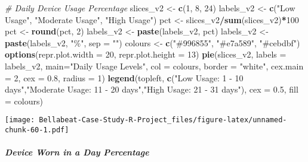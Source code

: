 \documentclass[
]{article}
\newenvironment{Shaded}{\begin{snugshade}}{\end{snugshade}}
\newcommand{\AttributeTok}[1]{\textcolor[rgb]{0.13,0.29,0.53}{#1}}
\newcommand{\CommentTok}[1]{\textcolor[rgb]{0.56,0.35,0.01}{\textit{#1}}}
\newcommand{\DecValTok}[1]{\textcolor[rgb]{0.00,0.00,0.81}{#1}}
\newcommand{\FloatTok}[1]{\textcolor[rgb]{0.00,0.00,0.81}{#1}}
\newcommand{\FunctionTok}[1]{\textcolor[rgb]{0.13,0.29,0.53}{\textbf{#1}}}
\newcommand{\NormalTok}[1]{#1}
\newcommand{\OtherTok}[1]{\textcolor[rgb]{0.56,0.35,0.01}{#1}}
\newcommand{\SpecialCharTok}[1]{\textcolor[rgb]{0.81,0.36,0.00}{\textbf{#1}}}
\newcommand{\StringTok}[1]{\textcolor[rgb]{0.31,0.60,0.02}{#1}}
\begin{document}
\begin{Shaded}
\begin{Highlighting}[]
\CommentTok{\# Daily Device Usage Percentage}
\NormalTok{slices\_v2 }\OtherTok{\textless{}{-}} \FunctionTok{c}\NormalTok{(}\DecValTok{1}\NormalTok{, }\DecValTok{8}\NormalTok{, }\DecValTok{24}\NormalTok{)}
\NormalTok{labels\_v2 }\OtherTok{\textless{}{-}} \FunctionTok{c}\NormalTok{(}\StringTok{"Low Usage"}\NormalTok{, }\StringTok{"Moderate Usage"}\NormalTok{, }\StringTok{"High Usage"}\NormalTok{)}
\NormalTok{pct }\OtherTok{\textless{}{-}}\NormalTok{ slices\_v2}\SpecialCharTok{/}\FunctionTok{sum}\NormalTok{(slices\_v2)}\SpecialCharTok{*}\DecValTok{100}
\NormalTok{pct }\OtherTok{\textless{}{-}} \FunctionTok{round}\NormalTok{(pct, }\DecValTok{2}\NormalTok{)}
\NormalTok{labels\_v2 }\OtherTok{\textless{}{-}} \FunctionTok{paste}\NormalTok{(labels\_v2, pct)}
\NormalTok{labels\_v2 }\OtherTok{\textless{}{-}} \FunctionTok{paste}\NormalTok{(labels\_v2, }\StringTok{"\%"}\NormalTok{, }\AttributeTok{sep =} \StringTok{""}\NormalTok{)}
\NormalTok{colours }\OtherTok{\textless{}{-}} \FunctionTok{c}\NormalTok{(}\StringTok{"\#996855"}\NormalTok{, }\StringTok{"\#e7a589"}\NormalTok{, }\StringTok{"\#cebdbf"}\NormalTok{)}
\FunctionTok{options}\NormalTok{(}\AttributeTok{repr.plot.width =} \DecValTok{20}\NormalTok{, }\AttributeTok{repr.plot.height =} \DecValTok{13}\NormalTok{)}
\FunctionTok{pie}\NormalTok{(slices\_v2, }\AttributeTok{labels =}\NormalTok{ labels\_v2,}
    \AttributeTok{main=}\StringTok{"Daily Usage Levels"}\NormalTok{,}
    \AttributeTok{col =}\NormalTok{ colours, }
    \AttributeTok{border =} \StringTok{"white"}\NormalTok{, }
    \AttributeTok{cex.main =} \DecValTok{2}\NormalTok{,}
    \AttributeTok{cex =} \FloatTok{0.8}\NormalTok{,}
    \AttributeTok{radius =} \DecValTok{1}\NormalTok{)}
\FunctionTok{legend}\NormalTok{(}\StringTok{\textquotesingle{}topleft\textquotesingle{}}\NormalTok{, }\FunctionTok{c}\NormalTok{(}\StringTok{"Low Usage: 1 {-} 10 days"}\NormalTok{,}\StringTok{"Moderate Usage: 11 {-} 20 days"}\NormalTok{,}\StringTok{"High Usage: 21 {-} 31 days"}\NormalTok{), }\AttributeTok{cex =} \FloatTok{0.5}\NormalTok{, }\AttributeTok{fill =}\NormalTok{ colours)}
\end{Highlighting}
\end{Shaded}

\texttt{[image: Bellabeat-Case-Study-R-Project\_files/figure-latex/unnamed-chunk-60-1.pdf]}

\hypertarget{device-worn-in-a-day-percentage}{%
\subparagraph{Device Worn in a Day
Percentage}\label{device-worn-in-a-day-percentage}}
\end{document}
